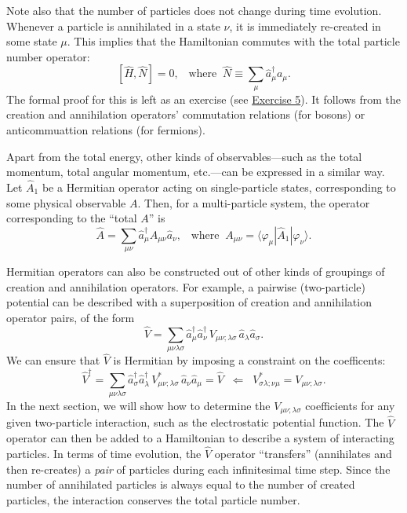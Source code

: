 \documentclass[pra,12pt]{revtex4}
\begin{document}
Note also that the number of particles does not change during time
evolution.  Whenever a particle is annihilated in a state $\nu$, it is
immediately re-created in some state $\mu$.  This implies that the
Hamiltonian commutes with the total particle number operator:
$$[\hat{H}, \hat{N}] = 0, \;\;\;\mathrm{where}\;\;\hat{N} \equiv \sum_\mu \hat{a}_\mu^\dagger a_\mu.$$
The formal proof for this is left as an exercise (see
\hyperref[ex:n_conserved]{Exercise 5}).  It follows from the creation
and annihilation operators' commutation relations (for bosons) or
anticommuattion relations (for fermions).

Apart from the total energy, other kinds of observables---such as the
total momentum, total angular momentum, etc.---can be expressed in a
similar way.  Let $\hat{A}_1$ be a Hermitian operator acting on
single-particle states, corresponding to some physical observable $A$.
Then, for a multi-particle system, the operator corresponding to the
``total $A$'' is
$$\hat{A} = \sum_{\mu\nu} \hat{a}^\dagger_\mu A_{\mu\nu} \hat{a}_\nu, \;\;\; \mathrm{where}\;\; A_{\mu\nu} = \langle\varphi_\mu|\hat{A}_1|\varphi_\nu\rangle.$$

Hermitian operators can also be constructed out of other kinds of
groupings of creation and annihilation operators.  For example, a
pairwise (two-particle) potential can be described with a
superposition of creation and annihilation operator pairs, of the form
$$\hat{V} = \sum_{\mu\nu\lambda\sigma} \hat{a}^\dagger_\mu \hat{a}^\dagger_\nu \, V_{\mu\nu;\lambda\sigma}\, \hat{a}_\lambda \hat{a}_\sigma.$$
We can ensure that $\hat{V}$ is Hermitian by imposing a
constraint on the coefficents:
$$\hat{V}^\dagger = \sum_{\mu\nu\lambda\sigma} \hat{a}^\dagger_\sigma \hat{a}^\dagger_\lambda \, V_{\mu\nu;\lambda\sigma}^* \, \hat{a}_\nu \hat{a}_\mu = \hat{V} \;\;\Leftarrow \;\; V_{\sigma\lambda;\nu\mu}^* = V_{\mu\nu;\lambda\sigma}.$$
In the next section, we will show how to determine the
$V_{\mu\nu;\lambda\sigma}$ coefficients for any given two-particle
interaction, such as the electrostatic potential function.  The
$\hat{V}$ operator can then be added to a Hamiltonian to describe a
system of interacting particles.  In terms of time evolution, the
$\hat{V}$ operator ``transfers'' (annihilates and then re-creates) a
\textit{pair} of particles during each infinitesimal time step.  Since
the number of annihilated particles is always equal to the number of
created particles, the interaction conserves the total particle
number.
\end{document}
